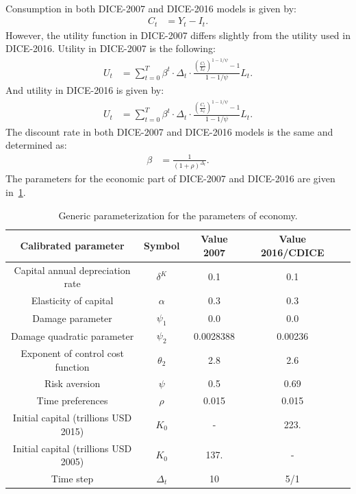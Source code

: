 \documentclass[11pt, a4paper, pdftex, twoside, dvipsnames]{article}
\begin{document}
\begin{appendices}
\begin{align}
\end{align}
Consumption in both DICE-2007 and DICE-2016 models is given by:
\begin{align}
    C_t &= Y_t - I_t.
\end{align}
%
However, the utility function in DICE-2007 differs slightly from the utility used in DICE-2016. Utility in DICE-2007 is the following:
\begin{align}
    U_t &= \sum_{t=0}^{T}{\beta^{t} \cdot \Delta_t \cdot \frac{\left(\frac{C_t}{L_t} \right)^{1-1/\psi} - 1 }{1-1/\psi} L_t }.
\end{align}
And utility in DICE-2016 is given by:
\begin{align}
    U_t &= \sum_{t=0}^{T}{\beta^{t} \cdot \Delta_t \cdot \frac{\left(\frac{C_t}{L_t} \right)^{1-1/\psi} - 1 }{1-1/\psi} L_t }.
\end{align}
The discount rate in both DICE-2007 and DICE-2016 models is the same and determined as:
\begin{align}
    \beta &= \frac{1}{(1+\rho)^{\Delta_t}}.
\end{align}
The parameters for the economic part of DICE-2007 and DICE-2016 are given in~\cref{table:econ}.
\begin{table}[H]
\centering
\begin{tabular}{ c c c c c  } 
 \toprule
 Calibrated parameter & Symbol  & Value 2007 & Value 2016/CDICE \\ 
 \midrule
 Capital annual depreciation rate & $\delta^K$  & 0.1 & 0.1  \\ 
 Elasticity of capital  & $\alpha$  & 0.3 & 0.3  \\
 Damage parameter  & $\psi_1$  & 0.0 & 0.0  \\
 Damage quadratic parameter  & $\psi_2$  & 0.0028388 & 0.00236  \\
 Exponent of control cost function  & $\theta_2$  & 2.8 & 2.6  \\
 Risk aversion  & $\psi$  & 0.5 & 0.69  \\
 Time preferences   & $\rho$  & 0.015 & 0.015  \\
 Initial capital (trillions USD 2015)  & $K_0$ & - & 223. \\
 Initial capital (trillions USD 2005)  & $K_0$ & 137. & - \\
 Time step & $\Delta_t$  & 10 & 5/1 \\
 \bottomrule
\end{tabular}
\caption{Generic parameterization for the parameters of economy.}
\label{table:econ}
\end{table}


\end{appendices}
\end{document}
